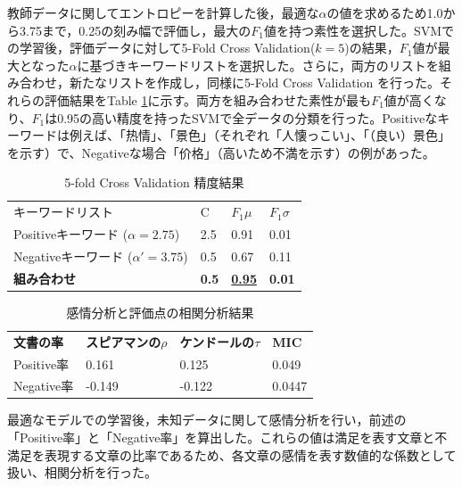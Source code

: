 \documentclass[review]{elsarticle}
\begin{document}
\begin{CJK}{UTF8}{min}
教師データに関してエントロピーを計算した後，最適な\(\alpha\)の値を求めるため1.0から3.75まで，0.25の刻み幅で評価し，最大の\(F_1\)値を持つ素性を選択した。SVMでの学習後，評価データに対して5-Fold Cross Validation(\(k = 5\))の結果，\(F_1\)値が最大となった\(\alpha\)に基づきキーワードリストを選択した。さらに，両方のリストを組み合わせ，新たなリストを作成し，同様に5-Fold Cross Validation を行った。それらの評価結果をTable \ref{tab:kfold_performance}に示す。両方を組み合わせた素性が最も\(F_1\)値が高くなり、\(F_1\)は0.95の高い精度を持ったSVMで全データの分類を行った。Positiveなキーワードは例えば、「热情」、「景色」（それぞれ「人懐っこい」、「（良い）景色」を示す）で、Negativeな場合「价格」（高いため不満を示す）の例があった。

\begin{table}[th]
\centering
\caption{5-fold Cross Validation 精度結果}
\label{tab:kfold_performance}
\begin{tabular}{llll}
キーワードリスト                & C            & \(F_1 \mu\)       & \(F_1 \sigma\) \\
Positiveキーワード (\(\alpha=2.75\))  & 2.5          & 0.91                & 0.01           \\
Negativeキーワード (\(\alpha'=3.75\)) & 0.5          & 0.67                & 0.11           \\
\rowcolor{DeepGreen}\color{white}\textbf{組み合わせ}
                                     & \textbf{0.5} & {\ul \textbf{0.95}} & \textbf{0.01}
\end{tabular}
\end{table}

\begin{table}[th]
\centering
\caption{感情分析と評価点の相関分析結果}
\label{tab:res_correl}
\begin{tabular}{llll}
\textbf{文書の率} & \textbf{スピアマンの\(\rho\)} & \textbf{ケンドールの\(\tau\)} & \textbf{MIC} \\
Positive率     & 0.161            & 0.125            & 0.049        \\
Negative率     & -0.149           & -0.122           & 0.0447      
\end{tabular}
\end{table}

最適なモデルでの学習後，未知データに関して感情分析を行い，前述の「Positive率」と「Negative率」を算出した。これらの値は満足を表す文章と不満足を表現する文章の比率であるため、各文章の感情を表す数値的な係数として扱い、相関分析を行った。



\end{CJK}
\end{document}

